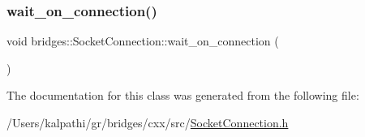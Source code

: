 \mbox{\label{classbridges_1_1_socket_connection_a17902452eaf3c292be57573a507d43cc}} 
\subsubsection{\texorpdfstring{wait\_on\_connection()}{wait\_on\_connection()}}
{\footnotesize\ttfamily void bridges\+::\+Socket\+Connection\+::wait\+\_\+on\+\_\+connection (\begin{DoxyParamCaption}{ }\end{DoxyParamCaption})\hspace{0.3cm}{\ttfamily [inline]}}



The documentation for this class was generated from the following file\+:\begin{DoxyCompactItemize}
\item 
/\+Users/kalpathi/gr/bridges/cxx/src/\mbox{\hyperlink{_socket_connection_8h}{Socket\+Connection.\+h}}\end{DoxyCompactItemize}
